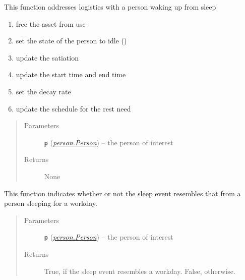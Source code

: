 \documentclass[letterpaper,10pt,english]{sphinxmanual}
\begin{document}
\begin{fulllineitems}
\begin{fulllineitems}
\label{sleep:sleep.Sleep.end_sleep}
This function addresses logistics with a person waking up from sleep
\begin{enumerate}
\item {} 
free the asset from use

\item {} 
set the state of the person to idle ()

\item {} 
update the satiation

\item {} 
update the start time and end time

\item {} 
set the decay rate

\item {} 
update the schedule for the rest need

\end{enumerate}
\begin{quote}\begin{description}
\item[{Parameters}] \leavevmode
\textbf{\texttt{p}} ({\hyperref[person:person.Person]{\emph{\emph{person.Person}}}}) -- the person of interest

\item[{Returns}] \leavevmode
None

\end{description}\end{quote}

\end{fulllineitems}


\begin{fulllineitems}
\label{sleep:sleep.Sleep.is_workday}
This function indicates whether or not the sleep event resembles that from a person sleeping for         a workday.
\begin{quote}\begin{description}
\item[{Parameters}] \leavevmode
\textbf{\texttt{p}} ({\hyperref[person:person.Person]{\emph{\emph{person.Person}}}}) -- the person of interest

\item[{Returns}] \leavevmode
True, if the sleep event resembles a workday. False, otherwise.


\end{description}
\end{quote}
\end{fulllineitems}
\end{fulllineitems}
\end{document}
